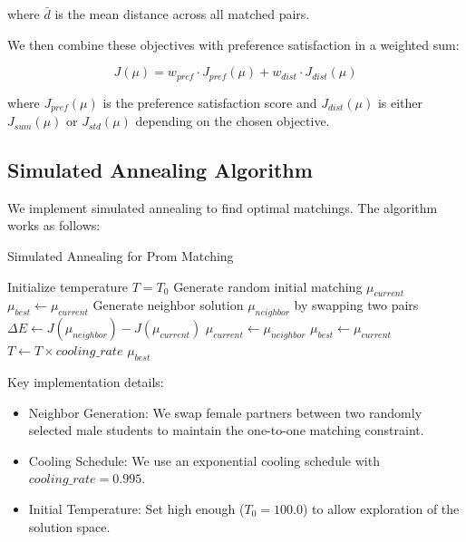 \documentclass[10pt,journal,compsoc]{IEEEtran}
\begin{document}
where $\bar{d}$ is the mean distance across all matched pairs.

We then combine these objectives with preference satisfaction in a weighted sum:

\begin{equation}
J(\mu) = w_{pref} \cdot J_{pref}(\mu) + w_{dist} \cdot J_{dist}(\mu)
\end{equation}

where $J_{pref}(\mu)$ is the preference satisfaction score and $J_{dist}(\mu)$ is either $J_{sum}(\mu)$ or $J_{std}(\mu)$ depending on the chosen objective.

\subsection{Simulated Annealing Algorithm}

We implement simulated annealing to find optimal matchings. The algorithm works as follows:

\begin{algorithm}
\caption{Simulated Annealing for Prom Matching}
\begin{algorithmic}
\STATE Initialize temperature $T = T_0$
\STATE Generate random initial matching $\mu_{current}$
\STATE $\mu_{best} \leftarrow \mu_{current}$
    \STATE Generate neighbor solution $\mu_{neighbor}$ by swapping two pairs
    \STATE $\Delta E \leftarrow J(\mu_{neighbor}) - J(\mu_{current})$
        \STATE $\mu_{current} \leftarrow \mu_{neighbor}$
            \STATE $\mu_{best} \leftarrow \mu_{current}$
        \ENDIF
    \ENDIF
    \STATE $T \leftarrow T \times cooling\_rate$
\ENDWHILE
\RETURN $\mu_{best}$
\end{algorithmic}
\end{algorithm}

Key implementation details:
\begin{itemize}
\item Neighbor Generation: We swap female partners between two randomly selected male students to maintain the one-to-one matching constraint.
\item Cooling Schedule: We use an exponential cooling schedule with $cooling\_rate = 0.995$.
\item Initial Temperature: Set high enough ($T_0 = 100.0$) to allow exploration of the solution space.
\end{itemize}
\end{document}
